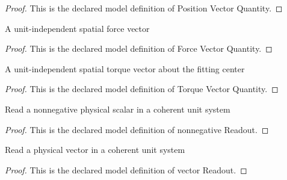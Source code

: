 \begin{proof}
  This is the declared model definition of Position Vector Quantity.
\end{proof}
\begin{definition}
  \label{def:physics:phyx-mini-0823:phyxminiproblems-problemphyxmini0823-forcevectorquantity}
  A unit-independent spatial force vector
\end{definition}
\begin{proof}
  This is the declared model definition of Force Vector Quantity.
\end{proof}
\begin{definition}
  \label{def:physics:phyx-mini-0823:phyxminiproblems-problemphyxmini0823-torquevectorquantity}
  A unit-independent spatial torque vector about the fitting center
\end{definition}
\begin{proof}
  This is the declared model definition of Torque Vector Quantity.
\end{proof}
\begin{definition}
  \label{def:physics:phyx-mini-0823:phyxminiproblems-problemphyxmini0823-nonnegativereadout}
  Read a nonnegative physical scalar in a coherent unit system
\end{definition}
\begin{proof}
  This is the declared model definition of nonnegative Readout.
\end{proof}
\begin{definition}
  \label{def:physics:phyx-mini-0823:phyxminiproblems-problemphyxmini0823-vectorreadout}
  Read a physical vector in a coherent unit system
\end{definition}
\begin{proof}
  This is the declared model definition of vector Readout.
\end{proof}
